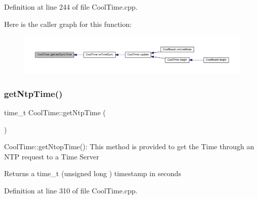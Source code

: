 Definition at line 244 of file Cool\+Time.\+cpp.

Here is the caller graph for this function\+:
\nopagebreak
\begin{figure}[H]
\begin{center}
\leavevmode
\includegraphics[width=350pt]{class_cool_time_a5d17f707a9d337720493b2bce9d41c21_icgraph}
\end{center}
\end{figure}
\mbox{\label{class_cool_time_a41fbbbfd651c2079f54d4b2911e4c705}} 
\subsubsection{\texorpdfstring{get\+Ntp\+Time()}{getNtpTime()}}
{\footnotesize\ttfamily time\+\_\+t Cool\+Time\+::get\+Ntp\+Time (\begin{DoxyParamCaption}{ }\end{DoxyParamCaption})}

Cool\+Time\+::get\+Ntop\+Time()\+: This method is provided to get the Time through an N\+TP request to a Time Server

\begin{DoxyReturn}{Returns}
a time\+\_\+t (unsigned long ) timestamp in seconds 
\end{DoxyReturn}


Definition at line 310 of file Cool\+Time.\+cpp.

